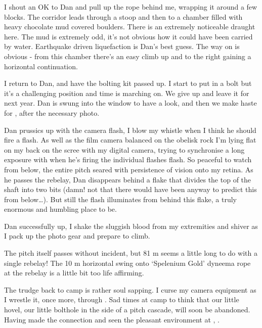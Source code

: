 I shout an OK to Dan and pull up the rope behind me, wrapping it around a
few blocks. The corridor leads through a stoop and then to a chamber
filled with heavy chocolate mud covered boulders. There is an extremely
noticeable draught here. The mud is extremely odd, it's not obvious how
it could have been carried by water. Earthquake driven liquefaction is
Dan's best guess. The way on is obvious - from this chamber there's an
easy climb up and to the right gaining a horizontal continuation.

I return to Dan, and have the bolting kit passed up. I start to put in a
bolt but it's a challenging position and time is marching on. We give up
and leave it for next year. Dan is swung into the window to have a look,
and then we make haste for , after the necessary photo.




Dan prussics up with the camera flash, I blow my whistle when I think he
should fire a flash. As well as the film camera balanced on the obelisk
rock I'm lying flat on my back on the scree with my digital camera,
trying to synchronise a long exposure with when he's firing the
individual flashes flash. So peaceful to watch from below, the entire
pitch seared with persistence of vision onto my retina. As he passes the
rebelay, Dan disappears behind a flake that divides the top of the shaft
into two bits (damn! not that there would have been anyway to predict
this from below\ldots{}). But still the flash illuminates from behind
this flake, a truly enormous and humbling place to be.

Dan successfully up, I shake the sluggish blood from my extremities and
shiver as I pack up the photo gear and prepare to climb.

The pitch itself passes without incident, but 81 m seems a little long
to do with a single rebelay! The 10 m horizontal swing onto `Spelenium
Gold' dyneema rope at the rebelay is a little bit too life affirming.

The trudge back to camp is rather soul sapping. I curse my camera
equipment as I wrestle it, once more, through . Sad
times at camp to think that our little hovel, our little bolthole in the
side of a pitch cascade, will soon be abandoned. Having made the
connection and seen the pleasant environment at , .

